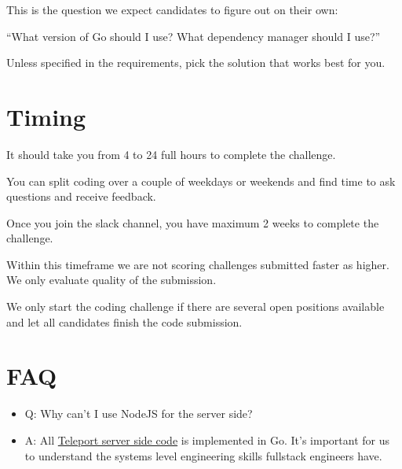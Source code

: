 \documentclass{article}
\begin{document}
This is the question we expect candidates to figure out on their own:

``What version of Go should I use? What dependency manager should I use?''

Unless specified in the requirements, pick the solution that works best for you.

\section{Timing}

It should take you from 4 to 24 full hours to complete the challenge.

You can split coding over a couple of weekdays or weekends and find time to ask questions and receive feedback.

Once you join the slack channel, you have maximum 2 weeks to complete the challenge.

Within this timeframe we are not scoring challenges submitted faster as higher.
We only evaluate quality of the submission.

We only start the coding challenge if there are several open positions available and let
all candidates finish the code submission.


\section{FAQ}

\begin{itemize} %
  \item[] Q: Why can't I use NodeJS for the server side?
  \item[] A: All \href{https://github.com/gravitational/teleport}{Teleport server side code} is implemented in Go.
It's important for us to understand the systems level engineering skills fullstack engineers have.
\end{itemize}
\end{document}
